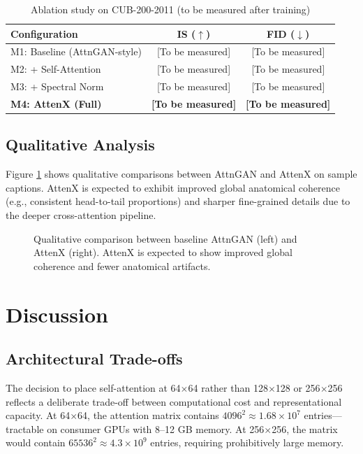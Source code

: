 \documentclass[conference]{IEEEtran}
\begin{document}
\begin{table}[htbp]
\caption{Ablation study on CUB-200-2011 (to be measured after training)}
\centering
\begin{tabular}{@{}lcc@{}}
\toprule
\textbf{Configuration} & \textbf{IS} ($\uparrow$) & \textbf{FID} ($\downarrow$) \\
\midrule
M1: Baseline (AttnGAN-style) & [To be measured] & [To be measured] \\
M2: + Self-Attention & [To be measured] & [To be measured] \\
M3: + Spectral Norm & [To be measured] & [To be measured] \\
\textbf{M4: AttenX (Full)} & \textbf{[To be measured]} & \textbf{[To be measured]} \\
\bottomrule
\end{tabular}
\label{tab:ablation}
\end{table}

\subsection{Qualitative Analysis}
Figure \ref{fig:comparison} shows qualitative comparisons between AttnGAN and AttenX on sample captions. AttenX is expected to exhibit improved global anatomical coherence (e.g., consistent head-to-tail proportions) and sharper fine-grained details due to the deeper cross-attention pipeline.

\begin{figure}[htbp]
\centering
{}
\caption{Qualitative comparison between baseline AttnGAN (left) and AttenX (right). AttenX is expected to show improved global coherence and fewer anatomical artifacts.}
\label{fig:comparison}
\end{figure}

\section{Discussion}
\label{sec:discussion}

\subsection{Architectural Trade-offs}
The decision to place self-attention at 64$\times$64 rather than 128$\times$128 or 256$\times$256 reflects a deliberate trade-off between computational cost and representational capacity. At 64$\times$64, the attention matrix contains $4096^2 \approx 1.68 \times 10^7$ entries---tractable on consumer GPUs with 8--12 GB memory. At 256$\times$256, the matrix would contain $65536^2 \approx 4.3 \times 10^9$ entries, requiring prohibitively large memory.
\end{document}
